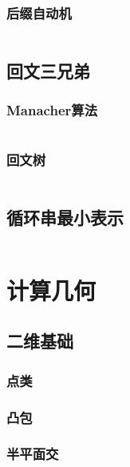 \documentclass[a4paper]{article}
\newcommand{\cppcode}[1]{
    \inputminted[mathescape]{cpp}{source/#1}
}
\begin{document}

\subsubsection{后缀自动机}

\cppcode{string-manipulation/suffix-automation.cpp}

\subsection{回文三兄弟}

\subsubsection{Manacher算法}

\cppcode{string-manipulation/manacher.cpp}

\subsubsection{回文树}

\cppcode{string-manipulation/palindrome-tree.cpp}

\subsection{循环串最小表示}

\cppcode{string-manipulation/minimum-circular-representation.cpp}

\section{计算几何}

\subsection{二维基础}

\subsubsection{点类}

\subsubsection{凸包}

\subsubsection{半平面交}
\end{document}
